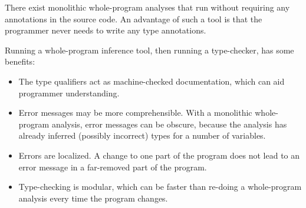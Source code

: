 
There exist monolithic whole-program analyses that run without requiring any
annotations in the source code.  An advantage of such a tool is that the
programmer never needs to write any type annotations.

Running a whole-program inference tool, then running a type-checker, has
some benefits:
\begin{itemize}
\item
  The type qualifiers act as machine-checked documentation,
  which can aid programmer understanding.
\item
  Error messages may be more comprehensible.  With a monolithic
  whole-program analysis, error messages can be obscure, because the
  analysis has already inferred (possibly incorrect) types for a number of
  variables.
\item
  Errors are localized.  A change to one part of the program does not lead
  to an error message in a far-removed part of the program.
\item
  Type-checking is modular, which can be faster than re-doing a
  whole-program analysis every time the program changes.
\end{itemize}




